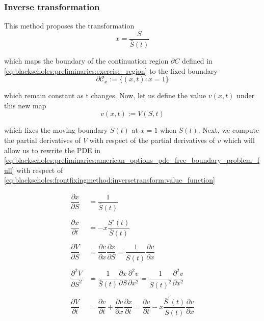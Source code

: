 \subsubsection{Inverse transformation} \label{sec:blackscholes:frontfixingmethod:inversetransform}

This method proposes the transformation 
\begin{equation}
    x = \dfrac{S}{\bar{S}(t)}
    \label{eq:blackscholes:frontfixingmethod:inversetransform}
\end{equation}

which maps the boundary of the continuation region $\partial C$ defined in 
\eqref{eq:blackscholes:preliminaries:exercise_region} to the fixed boundary 
\begin{equation}
  \mathcal{\partial C}_x := \{(x, t): x = 1\} 
\end{equation}

which remain constant as t changes. Now, let us define the value $v(x,t)$ 
under this new map
\begin{equation}
  v(x, t) := V(S, t)
  \label{eq:blackscholes:frontfixingmethod:inversetransform:value_function}
\end{equation}

which fixes the moving boundary $\bar{S}(t)$ at $x=1$ when $S(t)$. Next, we compute
the partial derivatives of $V$ with respect of the partial derivatives of $v$ which
will allow us to rewrite the PDE in \eqref{eq:blackscholes:preliminaries:american_options_pde_free_boundary_problem_full} 
with respect of \eqref{eq:blackscholes:frontfixingmethod:inversetransform:value_function}

\begin{align*}
  \dfrac{\partial{x}}{\partial{S}} &= \dfrac{1}{\bar{S}(t)} \\\\
  \dfrac{\partial{x}}{\partial{t}} &= -x\dfrac{\bar{S}'(t)}{\bar{S}(t)} \\\\
  \dfrac{\partial{V}}{\partial{S}} &= \dfrac{\partial{v}}{\partial{x}}\dfrac{\partial{x}}{\partial{S}} = \dfrac{1}{\bar{S}(t)}\dfrac{\partial{v}}{\partial{x}} \\\\
  \dfrac{\partial^2{V}}{\partial{S^2}} &= \dfrac{1}{\bar{S}(t)} \dfrac{\partial{x}}{\partial{S}} \dfrac{\partial^2{v}}{\partial{x^2}} = \dfrac{1}{\bar{S}(t)^2} \dfrac{\partial^2{v}}{\partial{x}^2} \\\\
  \dfrac{\partial{V}}{\partial{t}} &=  \dfrac{\partial{v}}{\partial{t}} + \dfrac{\partial{v}}{\partial{x}} \dfrac{\partial{x}}{\partial{t}} = \dfrac{\partial{v}}{\partial{t}} - x\dfrac{\bar{S}^\prime(t)}{\bar{S}(t)}\dfrac{\partial{v}}{\partial{x}}
\end{align*}

